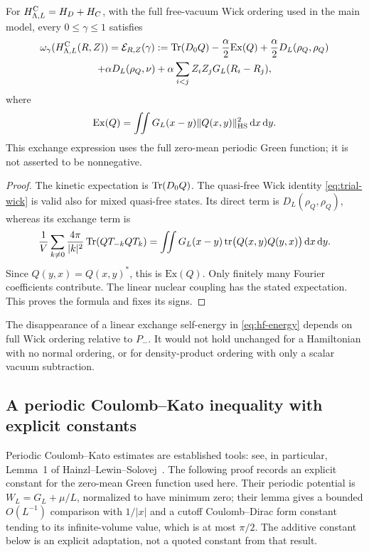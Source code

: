 \begin{lemma}
\label{lem:hf-energy}
For $H^{\rm C}_{\Lambda,L}=H_D+H_C$, with the full free-vacuum Wick ordering
used in the main model, every $0\le\gamma\le1$ satisfies
\begin{multline}
 \omega_\gamma(H^{\rm C}_{\Lambda,L}(R,Z))
 =\mathcal E_{R,Z}(\gamma)
 :=\operatorname{Tr}(D_0Q)-\frac\alpha2\mathrm{Ex}(Q)
       +\frac\alpha2D_L(\rho_Q,\rho_Q)\\
       +\alpha D_L(\rho_Q,\nu)
       +\alpha\sum_{i<j}Z_iZ_jG_L(R_i-R_j),
 \label{eq:hf-energy}
\end{multline}
where
\[
 \mathrm{Ex}(Q)=\iint G_L(x-y)\|Q(x,y)\|_{\mathrm{HS}}^2\,\mathrm d x\,\mathrm d y.
\]
This exchange expression uses the full zero-mean periodic Green function;
it is not asserted to be nonnegative.
\end{lemma}
\begin{proof}
The kinetic expectation is $\operatorname{Tr}(D_0Q)$.  The quasi-free Wick identity
\eqref{eq:trial-wick} is valid also for mixed quasi-free states.  Its direct
term is $D_L(\rho_Q,\rho_Q)$, whereas its exchange term is
\[
 \frac1V\sum_{k\ne0}\frac{4\pi}{|k|^2}\operatorname{Tr}(QT_{-k}QT_k)
 =\iint G_L(x-y)\operatorname{tr}\bigl(Q(x,y)Q(y,x)\bigr)\,\mathrm d x\,\mathrm d y.
\]
Since $Q(y,x)=Q(x,y)^*$, this is $\mathrm{Ex}(Q)$.  Only finitely many
Fourier coefficients contribute.  The linear nuclear coupling has the
stated expectation.  This proves the formula and fixes its signs.
\end{proof}

The disappearance of a linear exchange self-energy in
\eqref{eq:hf-energy} depends on full Wick ordering relative to $P_-$.
It would not hold unchanged for a Hamiltonian with no normal ordering, or
for density-product ordering with only a scalar vacuum subtraction.

\subsection{A periodic Coulomb--Kato inequality with explicit constants}

Periodic Coulomb--Kato estimates are established tools: see, in particular,
Lemma~1 of Hainzl--Lewin--Solovej~\cite{HLSol2007}.  The following proof
records an explicit constant for the zero-mean Green function used here.
Their periodic potential is $W_L=G_L+\mu/L$, normalized to have minimum
zero; their lemma gives a bounded $O(L^{-1})$ comparison with $1/|x|$ and
a cutoff Coulomb--Dirac form constant tending to its infinite-volume
value, which is at most $\pi/2$.  The additive constant below is an
explicit adaptation, not a quoted constant from that result.

